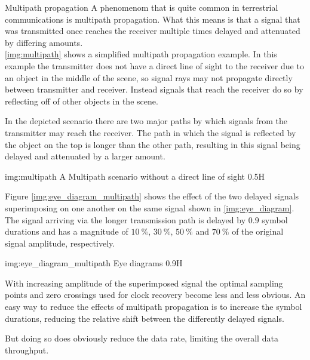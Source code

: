 \begin{subchapter}{Multipath propagation}
  A phenomenom that is quite common in terrestrial communications
  is multipath propagation.
  What this means is that a signal that was transmitted once reaches the
  receiver multiple times delayed and attenuated by differing amounts. \\

  \autoref{img:multipath} shows a simplified multipath propagation example.
  In this example the transmitter does not have a direct line of
  sight to the receiver due to an object in the middle of the scene,
  so signal rays may not propagate directly between transmitter and receiver.
  Instead signals that reach the receiver do
  so by reflecting off of other objects in the scene.

  In the depicted scenario there are two major paths by which signals from
  the transmitter may reach the receiver.
  The path in which the signal is reflected by the object on
  the top is longer than the other path, resulting in this signal being
  delayed and attenuated by a larger amount.

               {img:multipath}
               {A Multipath scenario without a direct line of sight}
               {0.5}{H}

  Figure \ref{img:eye_diagram_multipath} shows the effect of the
  two delayed signals superimposing on one another on the same signal
  shown in \autoref{img:eye_diagram}.
  The signal arriving via the longer transmission path
  is delayed by $0.9$ symbol durations and has a magnitude
  of $\SI{10}{\percent}$, $\SI{30}{\percent}$, $\SI{50}{\percent}$ and
  $\SI{70}{\percent}$ of the original signal amplitude, respectively.

               {img:eye_diagram_multipath}
               {Eye diagrams}
               {0.9}{H}

  With increasing amplitude of the superimposed signal the optimal
  sampling points and zero crossings used for clock recovery
  become less and less obvious.
  An easy way to reduce the effects of multipath propagation is to
  increase the symbol durations, reducing the relative shift between
  the differently delayed signals.

  But doing so does obviously reduce the data rate,
  limiting the overall data throughput.
\end{subchapter}

